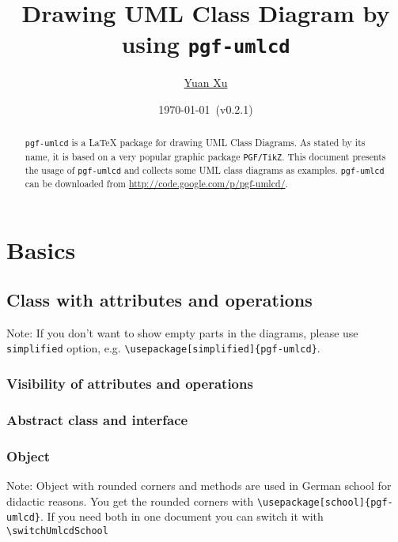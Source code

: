 \documentclass{article}
\newcommand{\demo}[2][1]{
\begin{minipage}{.49\linewidth}
\centering
\resizebox{#1\linewidth}{!}{

}
\end{minipage}
\hspace{0.01\linewidth}
\begin{minipage}{.5\linewidth}

\end{minipage}
}
\begin{document}
\title{Drawing UML Class Diagram by using \texttt{pgf-umlcd}}
\author{\href{mailto:xuyuan.cn@gmail.com}{Yuan Xu}}
\date{\today{}~(v0.2.1)}
\maketitle

\begin{abstract}
  \texttt{pgf-umlcd} is a LaTeX package for drawing UML Class
  Diagrams. As stated by its name, it is based on a very popular
  graphic package \texttt{PGF/TikZ}. This document presents the usage
  of \texttt{pgf-umlcd} and collects some UML class diagrams as
  examples. \texttt{pgf-umlcd} can be downloaded from
  \href{http://code.google.com/p/pgf-umlcd/}{http://code.google.com/p/pgf-umlcd/}.
\end{abstract}

\tableofcontents

\section{Basics}
\subsection{Class with attributes and operations}
Note: If you don't want to show empty parts in the diagrams, please
use \texttt{simplified} option, e.g. \lstinline|\usepackage[simplified]{pgf-umlcd}|.\\
\demo{class}

\subsubsection{Visibility of attributes and operations}
\demo[0.8]{visibility}

\subsubsection{Abstract class and interface}
\demo[0.5]{abstract-class}
\demo[0.5]{interface}

\subsubsection{Object}
\demo[0.7]{object}
Note: Object with rounded corners and methods are used in German school for didactic reasons. You get the rounded corners with \lstinline|\usepackage[school]{pgf-umlcd}|. If you need both in one document you can switch it with \lstinline|\switchUmlcdSchool| \\
\switchUmlcdSchool
\demo[0.7]{object}
\demo[0.7]{object-include-methods}
\end{document}
